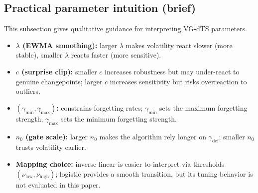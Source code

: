 \subsection{Practical parameter intuition (brief)}
This subsection gives qualitative guidance for interpreting VG-dTS parameters.
\begin{itemize}
\item \textbf{$\lambda$ (EWMA smoothing):} larger $\lambda$ makes volatility react slower (more stable), smaller $\lambda$ reacts faster (more sensitive).
\item \textbf{$c$ (surprise clip):} smaller $c$ increases robustness but may under-react to genuine changepoints; larger $c$ increases sensitivity but risks overreaction to outliers.
\item \textbf{$(\gamma_{\min},\gamma_{\max})$:} constrains forgetting rates; $\gamma_{\min}$ sets the maximum forgetting strength, $\gamma_{\max}$ sets the minimum forgetting strength.
\item \textbf{$n_0$ (gate scale):} larger $n_0$ makes the algorithm rely longer on $\gamma_{\mathrm{def}}$; smaller $n_0$ trusts volatility earlier.
\item \textbf{Mapping choice:} inverse-linear is easier to interpret via thresholds $(\nu_{\mathrm{low}},\nu_{\mathrm{high}})$; logistic provides a smooth transition, but its tuning behavior is not evaluated in this paper.
\end{itemize}
